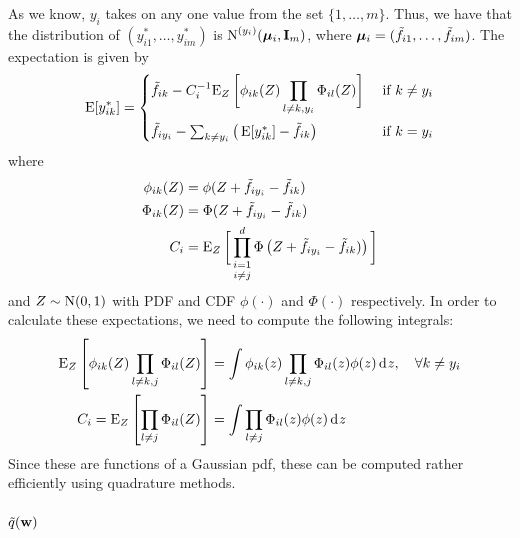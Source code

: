 As we know, $y_i$ takes on any one value from the set $\{1,\dots,m\}$. Thus, we have that the distribution of $(y^*_{i1}, \dots, y^*_{im})$ is $\operatorname{N}^{(y_i)}({\bm\mu}_i, {\mathbf I}_m)$, where ${\bm\mu}_i = (\tilde f_{i1}, \dots, \tilde f_{im})$. The expectation is given by
\[
  \operatorname{E}[y_{ik}^*] = 
  \begin{cases}
    \tilde f_{ik} - C_i^{-1}\displaystyle{ \operatorname{E}_Z\bigg[\phi_{ik}(Z) \prod_{l \neq k,y_i} \Phi_{il}(Z) \bigg] }
    &\text{ if } k \neq y_i \\[1.5em]
    \tilde f_{iy_i} - \sum_{k \neq y_i} \big(\operatorname{E}[y_{ik}^*] - \tilde f_{ik} \big) &\text{ if } k = y_i \\
  \end{cases}
\]
where
\begin{align*}
  \phi_{ik}(Z) &= \phi(Z + \tilde f_{iy_i} - \tilde f_{ik}) \\
  \Phi_{ik}(Z) &= \Phi(Z + \tilde f_{iy_i} - \tilde f_{ik}) \\
  C_i &= \operatorname{E}_Z \bigg[ \mathop{\prod_{i=1}^d}_{i \neq j} \Phi \left(Z + \tilde f_{iy_i} - \tilde f_{ik}) \right) \bigg]  
\end{align*}
and $Z \sim \operatorname{N}(0,1)$ with PDF and CDF $\phi(\cdot)$ and $\Phi(\cdot)$ respectively. In order to calculate these expectations, we need to compute the following integrals:
\begin{align*}
  \operatorname{E}_Z\left[\phi_{ik}(Z) \prod_{l \neq k,j} \Phi_{il}(Z) \right]
  &= \int \phi_{ik}(z) \prod_{l \neq k,j} \Phi_{il}(z) \phi(z) \operatorname{d\!\:\!} z, \ \ \ \forall k \neq y_i \\
  C_i = \operatorname{E}_Z\left[\prod_{l \neq j} \Phi_{il}(Z) \right] 
  &= \int \prod_{l \neq j} \Phi_{il}(z) \phi(z) \operatorname{d\!\:\!} z 
\end{align*}
Since these are functions of a Gaussian pdf, these can be computed rather efficiently using quadrature methods.

\subsubsection{$\tilde q({\mathbf w})$}

